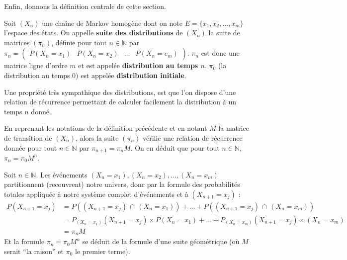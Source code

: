 	Enfin, donnons la définition centrale de cette section.

	\begin{formula}[Définition]
		\contentwidth[big]
		Soit $(X_n)$ une chaîne de Markov homogène dont on note $E = \{x_1, x_2, \dots, x_m\}$ l'espace des états. On appelle \textbf{suite des distributions} de $(X_n)$ la suite de matrices $(\pi_n)$, définie pour tout $n \in \mathbb{N}$ par $\displaystyle{\pi_n = \begin{pmatrix} P(X_n = x_1) & P(X_n = x_2) & \dots & P(X_n = e_m) \end{pmatrix}}$.
		\newpar
		$\pi_n$ est donc une matrice ligne d'ordre $m$ et est appelée \textbf{distribution au temps $n$}.
		\newpar
		$\pi_0$ (la distribution au temps $0$) est appelée \textbf{distribution initiale}.
	\end{formula}

	Une propriété très sympathique des distributions, est que l'on dispose d'une relation de récurrence permettant de calculer facilement la distribution à un temps $n$ donné.

	\begin{formula}
		En reprenant les notations de la définition précédente et en notant $M$ la matrice de transition de $(X_n)$, alors la suite $(\pi_n)$ vérifie une relation de récurrence donnée pour tout $n \in \mathbb{N}$ par $\pi_{n+1} = \pi_n M$.
		\newpar
		On en déduit que pour tout $n \in \mathbb{N}$, $\pi_n = \pi_0 M^n$.
	\end{formula}

	\begin{demonstration}
		Soit $n \in \mathbb{N}$. Les événements $(X_n = x_1), (X_n = x_2), \dots, (X_n =x_m)$ partitionnent (recouvrent) notre univers, donc par la formule des probabilités totales appliquée à notre système complet d'événements et à $(X_{n+1} = x_j)$ :
		\begin{align*}
			P(X_{n+1} = x_j) &= P((X_{n+1} = x_j) \, \cap \, (X_n = x_1)) + \dots + P((X_{n+1} = x_j) \, \cap \, (X_n = x_m)) \\
			&= P_{(X_n = x_1)}(X_{n+1} = x_j) \times P(X_n = x_1) + \dots + P_{(X_n = x_m)}(X_{n+1} = x_j) \times (X_n = x_m) \\
			&= \pi_n M
		\end{align*}
		Et la formule $\pi_n = \pi_0 M^n$ se déduit de la formule d'une suite géométrique (où $M$ serait ``la raison'' et $\pi_0$ le premier terme).
	\end{demonstration}

